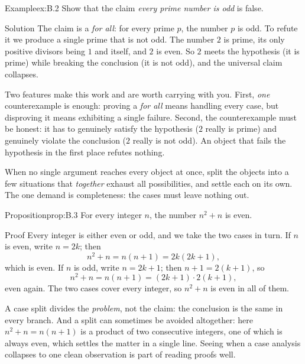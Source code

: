 \documentclass[a4paper,12pt,oneside]{memoir}
\begin{document}
\begin{workedexample}
\begin{envexample}{Example}{ex:B.2}{}
Show that the claim \emph{every prime number is odd} is false.
\end{envexample}
\begin{envsolution}{Solution}{}{}
The claim is a \emph{for all}: for every prime \(p\), the number \(p\) is odd. To refute it we produce a single prime that is not odd. The number \(2\) is prime, its only positive divisors being \(1\) and itself, and \(2\) is even. So \(2\) meets the hypothesis (it is prime) while breaking the conclusion (it is not odd), and the universal claim collapses.

Two features make this work and are worth carrying with you. First, \emph{one} counterexample is enough: proving a \emph{for all} means handling every case, but disproving it means exhibiting a single failure. Second, the counterexample must be honest: it has to genuinely satisfy the hypothesis (\(2\) really is prime) and genuinely violate the conclusion (\(2\) really is not odd). An object that fails the hypothesis in the first place refutes nothing.
\end{envsolution}
\end{workedexample}
 When no single argument reaches every object at once, split the objects into a few situations that \emph{together} exhaust all possibilities, and settle each on its own. The one demand is completeness: the cases must leave nothing out.

\begin{envproposition}{Proposition}{prop:B.3}{}
For every integer \(n\), the number \(n^{2} + n\) is even.
\end{envproposition}
\begin{envproof}{Proof}{}{}
Every integer is either even or odd, and we take the two cases in turn. If \(n\) is even, write \(n = 2k\); then \[ n^{2} + n = n(n + 1) = 2k(2k + 1), \] which is even. If \(n\) is odd, write \(n = 2k + 1\); then \(n + 1 = 2(k + 1)\), so \[ n^{2} + n = n(n + 1) = (2k + 1)\cdot 2(k + 1), \] even again. The two cases cover every integer, so \(n^{2} + n\) is even in all of them. \qedmark
\end{envproof}
A case split divides the \emph{problem}, not the claim: the conclusion is the same in every branch. And a split can sometimes be avoided altogether: here \(n^{2} + n = n(n + 1)\) is a product of two consecutive integers, one of which is always even, which settles the matter in a single line. Seeing when a case analysis collapses to one clean observation is part of reading proofs well.
\end{document}
